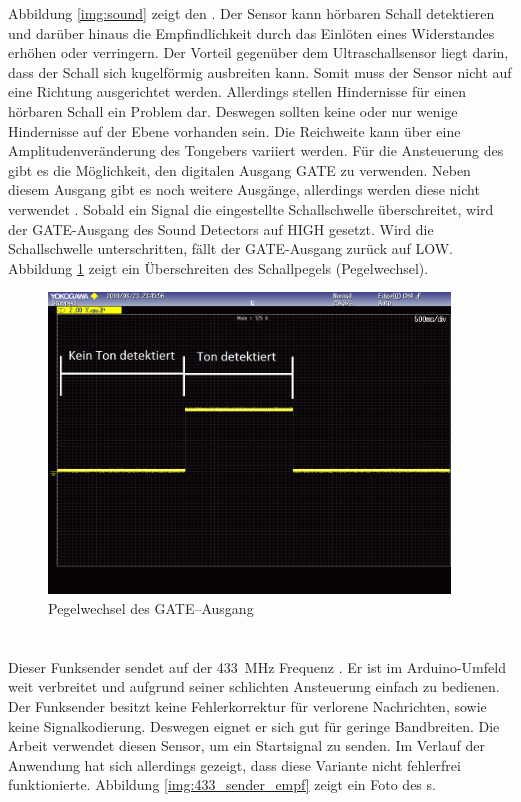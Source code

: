 Abbildung \ref{img:sound} zeigt den \microphone. Der Sensor kann hörbaren Schall detektieren und darüber hinaus die Empfindlichkeit durch das Einlöten eines Widerstandes erhöhen oder verringern. Der Vorteil gegenüber dem Ultraschallsensor liegt darin, dass der Schall sich kugelförmig ausbreiten kann. Somit muss der Sensor nicht auf eine Richtung ausgerichtet werden. Allerdings stellen Hindernisse für einen hörbaren Schall ein Problem dar. Deswegen sollten keine oder nur wenige Hindernisse auf der Ebene vorhanden sein. Die Reichweite kann über eine Amplitudenveränderung des Tongebers variiert werden. Für die Ansteuerung des \microphone \platz gibt es die Möglichkeit, den digitalen Ausgang \si{GATE} zu verwenden. Neben diesem Ausgang gibt es noch weitere Ausgänge, allerdings werden diese nicht verwendet \cite{src_SOUND_DETECTOR}. Sobald ein Signal die eingestellte Schallschwelle überschreitet, wird der \si{GATE}-Ausgang des Sound Detectors auf \si{HIGH} gesetzt. Wird die Schallschwelle unterschritten, fällt der \si{GATE}-Ausgang zurück auf \si{LOW}. Abbildung \ref{img:gate_ausgang} zeigt ein Überschreiten des Schallpegels (Pegelwechsel).
 
\begin{figure}[H]
        \centering
        \includegraphics[width=0.95\textwidth]{images/gate_ausgang.png}
        \caption{Pegelwechsel des \si{GATE}--Ausgang}
        \label{img:gate_ausgang}
\end{figure}

\paragraph{\funkempfaenger}\mbox{}\\
Dieser Funksender sendet auf der \SI{433}{\mega \hertz} Frequenz \cite{src_433_FUNKSENDER}. Er ist im Arduino-Umfeld weit verbreitet und aufgrund seiner schlichten Ansteuerung einfach zu bedienen. Der Funksender besitzt keine Fehlerkorrektur für verlorene Nachrichten, sowie keine Signalkodierung. Deswegen eignet er sich gut für geringe Bandbreiten. Die Arbeit verwendet diesen Sensor, um ein Startsignal zu senden. Im Verlauf der Anwendung hat sich allerdings gezeigt, dass diese Variante nicht fehlerfrei funktionierte. Abbildung \ref{img:433_sender_empf} zeigt ein Foto des \funkempfaenger s.


